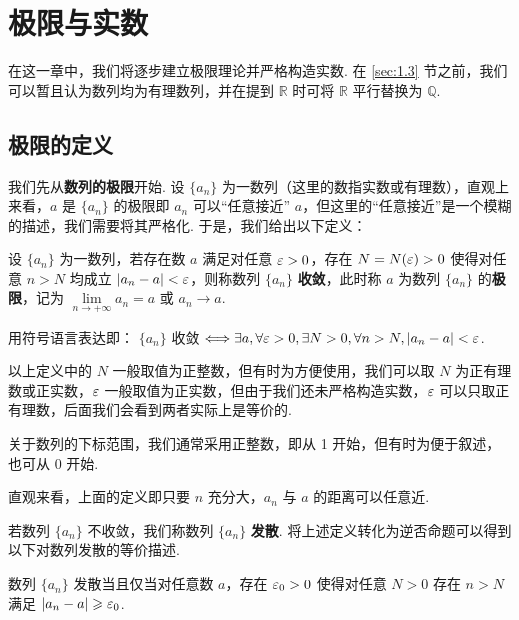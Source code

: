\documentclass[../main.tex]{subfiles}
\begin{document}
\chapter{极限与实数}

在这一章中，我们将逐步建立极限理论并严格构造实数. 在 \ref{sec:1.3} 节之前，我们可以暂且认为数列均为有理数列，并在提到 $\mathbb R$ 时可将 $\mathbb R$ 平行替换为 $\mathbb Q$. 

\section{极限的定义} \label{sec:1.1}

我们先从\textbf{数列的极限}开始. 设 $\{a_n\}$ 为一数列（这里的数指实数或有理数），直观上来看，$a$ 是 $\{a_n\}$ 的极限即 $a_n$ 可以“任意接近” $a$，但这里的“任意接近”是一个模糊的描述，我们需要将其严格化. 于是，我们给出以下定义：

\begin{definition}[数列极限的算术化定义] \label{def:lim-num-seq}
    设 $\{a_n\}$ 为一数列，若存在数 $a$ 满足对任意 $\varepsilon > 0$，存在 $N = N(\varepsilon) > 0$ 使得对任意 $n > N$ 均成立 $|a_n - a| < \varepsilon$，则称数列 $\{a_n\}$ \textbf{收敛}，此时称 $a$ 为数列 $\{a_n\}$ 的\textbf{极限}，记为 $\lim\limits_{n \to +\infty} a_n = a$ 或 $a_n \to a$. 

    用符号语言表达即： $\{a_n\}$ 收敛 $\Longleftrightarrow \exists a, \forall \varepsilon > 0, \exists N > 0, \forall n > N, |a_n - a| < \varepsilon$. 
\end{definition}

\begin{remark}
    以上定义中的 $N$ 一般取值为正整数，但有时为方便使用，我们可以取 $N$ 为正有理数或正实数，$\varepsilon$ 一般取值为正实数，但由于我们还未严格构造实数，$\varepsilon$ 可以只取正有理数，后面我们会看到两者实际上是等价的. 

    关于数列的下标范围，我们通常采用正整数，即从 1 开始，但有时为便于叙述，也可从 0 开始. 

    直观来看，上面的定义即只要 $n$ 充分大，$a_n$ 与 $a$ 的距离可以任意近. 
\end{remark}

若数列 $\{a_n\}$ 不收敛，我们称数列 $\{a_n\}$ \textbf{发散}. 将上述定义转化为逆否命题可以得到以下对数列发散的等价描述. 

\begin{proposition} \label{prop:1.1.1}
    数列 $\{a_n\}$ 发散当且仅当对任意数 $a$，存在 $\varepsilon_0 > 0$ 使得对任意 $N > 0$ 存在 $n > N$ 满足 $|a_n - a| \geqslant \varepsilon_0$. 
\end{proposition}
\end{document}
